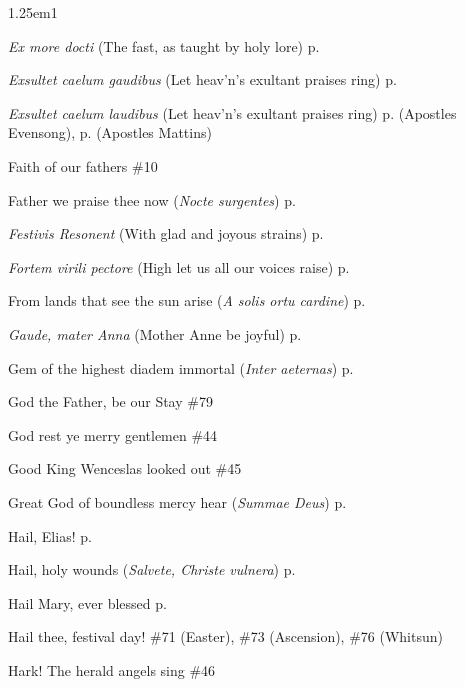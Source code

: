 \begin{hangparas}{1.25em}{1}
\par\noindent
\textit{Ex more docti} (The fast, as taught by holy lore) \dotfill p. \pageref{FirstLentInvitatoryHymn}
\par\noindent
\textit{Exsultet caelum gaudibus} (Let heav'n's exultant praises ring) \dotfill p. \pageref{JohnMattins}
\par\noindent
\textit{Exsultet caelum laudibus} (Let heav'n's exultant praises ring) \dotfill p. \pageref{ApostlesEvensong} (Apostles Evensong), p. \pageref{ApostlesMattins} (Apostles Mattins)
\par\noindent
Faith of our fathers \dotfill \#10
\par\noindent
Father we praise thee now (\textit{Nocte surgentes}) \dotfill p. \pageref{SundayInvitatorySummer}
\par\noindent
\textit{Festivis Resonent} (With glad and joyous strains) \dotfill p. \pageref{PreciousBloodEvensong}
\par\noindent
\textit{Fortem virili pectore} (High let us all our voices raise) \dotfill p. \pageref{MartyressNotVirginMattins}
\par\noindent
From lands that see the sun arise (\textit{A solis ortu cardine}) \dotfill p. \pageref{ChristmasMattins}
\par\noindent
\textit{Gaude, mater Anna} (Mother Anne be joyful) \dotfill p. \pageref{AnneIEvensong}
\par\noindent
Gem of the highest diadem immortal (\textit{Inter aeternas}) \dotfill p. \pageref{BenedictMattins}
\par\noindent
God the Father, be our Stay \dotfill \#79
\par\noindent
God rest ye merry gentlemen \dotfill \#44
\par\noindent
Good King Wenceslas looked out \dotfill \#45
\par\noindent
Great God of boundless mercy hear (\textit{Summae Deus}) \dotfill p. \pageref{SaturdayInvitatory}
\par\noindent
Hail, Elias! \dotfill p. \pageref{EliasMattins}
\par\noindent
Hail, holy wounds (\textit{Salvete, Christe vulnera}) \dotfill p. \pageref{PreciousBloodMattins}
\par\noindent
Hail Mary, ever blessed \dotfill p. \pageref{WalsinghamEvensong}
\par\noindent
Hail thee, festival day! \dotfill \#71 (Easter), \#73 (Ascension), \#76 (Whitsun)
\par\noindent
Hark! The herald angels sing \dotfill \#46

\end{hangparas}
